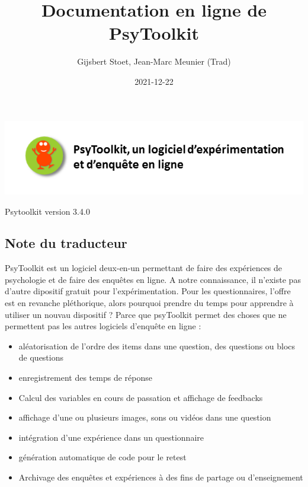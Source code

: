 \documentclass[
]{book}
\title{Documentation en ligne de PsyToolkit}
\author{Gijsbert Stoet, Jean-Marc Meunier (Trad)}
\date{2021-12-22}
\providecommand{\tightlist}{%
  \setlength{\itemsep}{0pt}\setlength{\parskip}{0pt}}
\begin{document}
\maketitle

{
\setcounter{tocdepth}{1}
\tableofcontents
}
\hypertarget{section}{%
\chapter*{}\label{section}}

\includegraphics{img/x11.png}

Psytoolkit version 3.4.0

\hypertarget{note-du-traducteur}{%
\section*{Note du traducteur}\label{note-du-traducteur}}

PsyToolkit est un logiciel deux-en-un permettant de faire des expériences de psychologie et de faire des enquêtes en ligne. A notre connaissance, il n'existe pas d'autre dipositif gratuit pour l'expérimentation. Pour les questionnaires, l'offre est en revanche pléthorique, alors pourquoi prendre du temps pour apprendre à utiliser un nouvau dispositif ? Parce que psyToolkit permet des choses que ne permettent pas les autres logiciels d'enquête en ligne :

\begin{itemize}
\tightlist
\item
  aléatorisation de l'ordre des items dans une question, des questions ou blocs de questions
\item
  enregistrement des temps de réponse
\item
  Calcul des variables en cours de passation et affichage de feedbacks
\item
  affichage d'une ou plusieurs images, sons ou vidéos dans une question
\item
  intégration d'une expérience dans un questionnaire
\item
  génération automatique de code pour le retest
\item
  Archivage des enquêtes et expériences à des fins de partage ou d'enseignement
\end{itemize}
\end{document}
